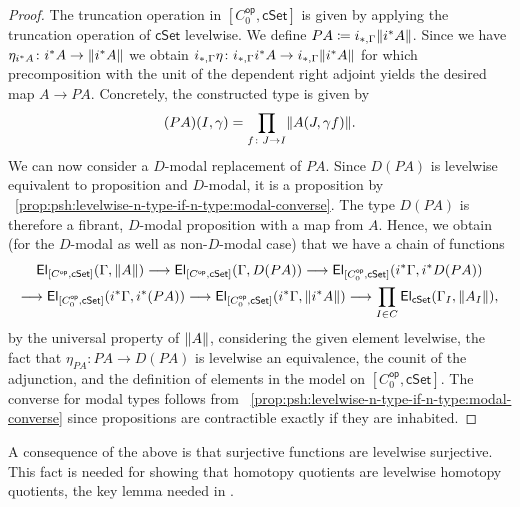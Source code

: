 \documentclass[10pt,a4paper]{article}
\theoremstyle{definition}
\theoremstyle{remark}
\newcommand{\cSet}{\mathsf{cSet}}
\DeclareMathOperator\op{\mathsf{op}}
\newcommand\El{\mathsf{El}}
\begin{document}
\begin{proof}
  The truncation operation in \([C_0^{\op}, \cSet]\) is given by applying the truncation operation of \(\cSet\) levelwise.
  We define \(PA \coloneqq i_{*,\Gamma}\trunc{i^*A}\).
  Since we have \(\eta_{i^*A} \colon i^* A \to \trunc{i^*A}\) we obtain \(i_{*,\Gamma}\eta \colon i_{*,\Gamma}i^*A \to i_{*,\Gamma}\trunc{i^*A}\) for which precomposition with the unit of the dependent right adjoint yields the desired map \(A \to PA\).
  Concretely, the constructed type is given by
  \[
    (PA)(I, \gamma) = \prod_{f \colon J \to I} \trunc{A(J, \gamma f)}.
  \]
  We can now consider a \(D\)-modal replacement of \(PA\).
  Since \(D(PA)\) is levelwise equivalent to proposition and \(D\)-modal, it is a proposition by ~\ref{prop:psh:levelwise-n-type-if-n-type:modal-converse}.
  The type \(D(PA)\) is therefore a fibrant, \(D\)-modal proposition with a map from \(A\).
  Hence, we obtain (for the \(D\)-modal as well as non-\(D\)-modal case) that we have a chain of functions
  \begin{multline*}
    \El_{[C^{\op}, \cSet]}(\Gamma, \trunc{A})
    \longrightarrow \El_{[C^{\op}, \cSet]}(\Gamma, D(PA))
    \longrightarrow \El_{[C_0^{\op}, \cSet]}(i^*\Gamma, i^*D(PA)) \\
    \longrightarrow \El_{[C_0^{\op}, \cSet]}(i^*\Gamma, i^*(PA))
    \longrightarrow \El_{[C_0^{\op}, \cSet]}(i^*\Gamma, \trunc{i^*A})
    \longrightarrow \prod_{I \in C} \El_{\cSet}(\Gamma_I, \trunc{A_I}),
  \end{multline*}
  by the universal property of \(\trunc{A}\), considering the given element levelwise, the fact that \(\eta_{PA} \colon PA \to D(PA)\) is levelwise an equivalence, the counit of the adjunction, and the definition of elements in the model on \([C^{\op}_0, \cSet]\).
  The converse for modal types follows from ~\ref{prop:psh:levelwise-n-type-if-n-type:modal-converse} since propositions are contractible exactly if they are inhabited.
\end{proof}

A consequence of the above is that surjective functions are levelwise surjective.
This fact is needed for showing that homotopy quotients are levelwise homotopy quotients, the key lemma needed in .
\end{document}
